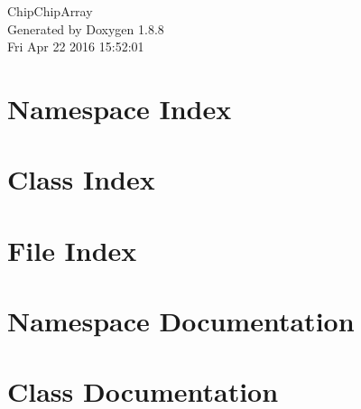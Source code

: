 \documentclass[twoside]{book}
\newcommand{\+}{\discretionary{\mbox{\scriptsize$\hookleftarrow$}}{}{}}
\newcommand{\clearemptydoublepage}{%
  \newpage{\pagestyle{empty}\cleardoublepage}%
}
\begin{document}
\hypersetup{pageanchor=false,
             bookmarks=true,
             bookmarksnumbered=true,
             pdfencoding=unicode
            }
\begin{titlepage}
\vspace*{7cm}
\begin{center}%
{\Large Chip\+Chip\+Array }\\
\vspace*{1cm}
{\large Generated by Doxygen 1.8.8}\\
\vspace*{0.5cm}
{\small Fri Apr 22 2016 15:52:01}\\
\end{center}
\end{titlepage}
\clearemptydoublepage
\tableofcontents
\clearemptydoublepage
{}
\hypersetup{pageanchor=true}

\chapter{Namespace Index}

\chapter{Class Index}

\chapter{File Index}

\chapter{Namespace Documentation}


\chapter{Class Documentation}






\end{document}
